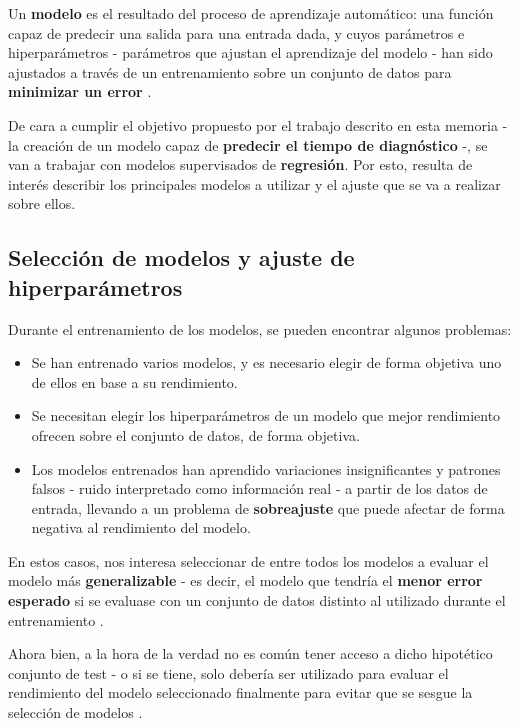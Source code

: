 Un \textbf{modelo} es el resultado del proceso de aprendizaje automático: una función capaz de predecir una salida para una entrada dada, y cuyos parámetros e hiperparámetros - parámetros que ajustan el aprendizaje del modelo - han sido ajustados a través de un entrenamiento sobre un conjunto de datos para \textbf{minimizar un error} \cite{Burkov2019TheHM}. 

De cara a cumplir el objetivo propuesto por el trabajo descrito en esta memoria - la creación de un modelo capaz de \textbf{predecir el tiempo de diagnóstico} -, se van a trabajar con modelos supervisados de \textbf{regresión}. Por esto, resulta de interés describir los principales modelos a utilizar y el ajuste que se va a realizar sobre ellos.

\subsection{Selección de modelos y ajuste de hiperparámetros}

Durante el entrenamiento de los modelos, se pueden encontrar algunos problemas:

\begin{itemize}[parsep=1pt, itemsep=1pt, topsep=4pt]
	\item Se han entrenado varios modelos, y es necesario elegir de forma objetiva uno de ellos en base a su rendimiento.
	\item Se necesitan elegir los hiperparámetros de un modelo que mejor rendimiento ofrecen sobre el conjunto de datos, de forma objetiva.
	\item Los modelos entrenados han aprendido variaciones insignificantes y patrones falsos - ruido interpretado como información real - a partir de los datos de entrada, llevando a un problema de \textbf{sobreajuste} \cite{mlprobabilistic} que puede afectar de forma negativa al rendimiento del modelo.
\end{itemize}

En estos casos, nos interesa seleccionar de entre todos los modelos a evaluar el modelo más \textbf{generalizable} - es decir, el modelo que tendría el \textbf{menor error esperado} si se evaluase con un conjunto de datos distinto al utilizado durante el entrenamiento \cite{mlprobabilistic}. 

Ahora bien, a la hora de la verdad no es común tener acceso a dicho hipotético conjunto de test - o si se tiene, solo debería ser utilizado para evaluar el rendimiento del modelo seleccionado finalmente para evitar que se sesgue la selección de modelos \cite{aima}. 

